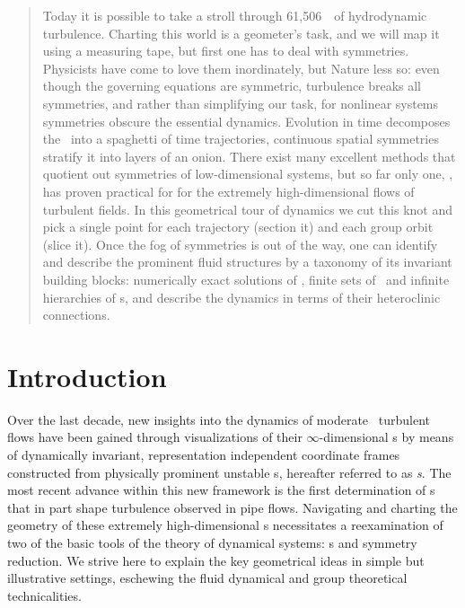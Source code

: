 \documentclass[aip,cha,reprint,
secnumarabic,
nofootinbib, tightenlines,
nobibnotes, showkeys, showpacs,
groupedaddress
]{revtex4-1}
\begin{document}
\begin{quotation}
Today it is possible to take a stroll through 61,506\dmn\ \statesp\ of
hydrodynamic turbulence. Charting this world is a geometer's task, and we
will map it using a measuring tape, but first one has to deal with
symmetries. Physicists have come to love them inordinately, but Nature
less so: even though the governing equations are symmetric, turbulence
breaks all symmetries, and rather than simplifying our task, for
nonlinear systems symmetries obscure the essential dynamics. Evolution
in time decomposes the \statesp\ into a spaghetti of time trajectories,
continuous spatial symmetries stratify it into layers of an onion. There
exist many excellent methods that quotient out symmetries of
low-dimensional systems, but so far only one, \mslices, has proven practical for
for the extremely high-dimensional flows of turbulent fields. In this
geometrical tour of dynamics we cut this knot and pick a
single point for each trajectory (section it) and each group orbit (slice
it). Once the fog of symmetries is out of the way, one can identify and
describe the prominent fluid structures by a taxonomy of its invariant
building blocks: numerically exact solutions of \NSe, finite sets of
\reqva\ and infinite hierarchies of \rpo s, and describe the dynamics in
terms of their heteroclinic connections.
\end{quotation}

\section{Introduction}
\label{s:intro}

Over the last decade, new insights into the dynamics of moderate
\Reynolds\ turbulent flows have been gained through visualizations of
their $\infty$-dimensional \statesp s by means of dynamically invariant,
representation independent coordinate frames constructed from
physically prominent unstable {\cohStr s}, hereafter referred to as {\em
\template s}.
The most recent advance within this new framework is
the first determination of \rpo s that in part shape turbulence observed
in pipe flows. Navigating and charting the geometry of these
extremely high-dimensional \statesp s necessitates a reexamination of two
of the basic tools of the theory of dynamical systems: \PoincSec s and symmetry
reduction. We strive
here to explain the key geometrical ideas in simple but illustrative
settings, eschewing the fluid dynamical and group theoretical
technicalities.
\end{document}
